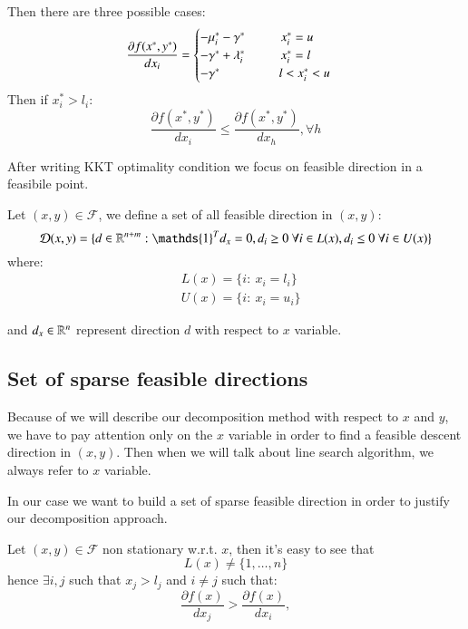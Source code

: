 Then there are three possible cases:
\begin{equation}
 \frac{\partial f(x^*,y^*)}{dx_i} = \begin{cases} -\mu_i^* -\gamma^* \hspace{1cm} x^*_i =u \\
 -\gamma^*+\lambda^*_i \hspace{1cm} x^*_i =l \\
 -\gamma^* \hspace{1.65cm} l<x^*_i <u 
\end{cases}
\end{equation}
Then if $x^*_i>l_i$: 
\begin{equation}
 \frac{\partial f(x^*,y^*)}{dx_i} \le \frac{\partial f(x^*,y^*)}{dx_h}, \forall h
\end{equation}

After writing KKT optimality condition we focus on feasible direction in a feasibile point.

Let $(x,y) \in \mathcal{F}$, we define a set of all feasible direction in $(x,y)$:
\begin{equation}
 \mathcal{D}(x,y)=\{ d \in \R^{n+m}: \mathds{1}^Td_x=0, d_i\ge 0 \ \forall i \in L(x), d_i\le 0 \ \forall i \in U(x)\}
\end{equation}
where:
\begin{equation}
 \begin{aligned}
  &L(x)=\{ i: \ x_i=l_i\}\\
  &U(x)=\{ i: \ x_i=u_i\}
 \end{aligned}
\end{equation}

and $d_x \in \mathbb{R}^n$ represent direction $d$ with respect to $x$ variable.

\subsection{Set of sparse feasible directions}
Because of we will describe our decomposition method with respect to $x$ and $y$, we have to pay attention only on the $x$ variable in order to find a feasible descent direction in $(x,y)$.
Then when we will talk about line search algorithm, we always refer to $x$ variable.

In our case we want to build a set of sparse feasible direction in order to justify our decomposition approach.

Let $(x,y) \in \mathcal{F}$ non stationary w.r.t. $x$, then it's easy to see that
\begin{equation}
 L(x)\ne \{1,\ldots,n\}
\end{equation}
hence $\exists i,j$ such that $x_j>l_j$ and $i \ne j$ such that:
\begin{equation}
 \frac{\partial f(x)}{dx_j} > \frac{\partial f(x)}{dx_i}, 
\end{equation}

